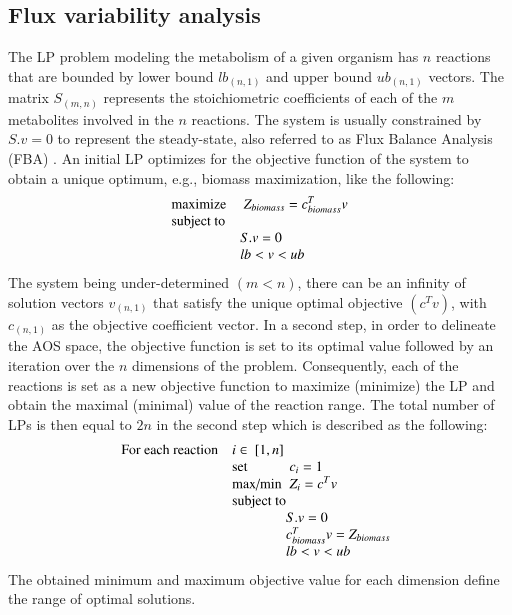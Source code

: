 \subsection*{Flux variability analysis}
The LP problem modeling the metabolism of a given organism has $n$ reactions that are bounded by lower bound $lb_{(n,1)}$ and upper bound $ub_{(n,1)}$ vectors.  The matrix $S_{(m,n)}$ represents the stoichiometric coefficients of each of the $m$ metabolites involved in the $n$ reactions. The system is usually constrained by $S.v=0$ to represent the steady-state, also referred to as Flux Balance Analysis (FBA) \cite{orth2010flux}. An initial LP optimizes for the objective function of the system to obtain a unique optimum, e.g., biomass maximization, like the following:
\begin{equation} \label{eq:one}
\begin{array}{ll@{}ll}
\text{maximize}  & \displaystyle\ Z_{biomass}=c^{T}_{biomass}v &\\
\text{subject to}\\
& S.v=0 \\
& lb<v<ub
\end{array}
\end{equation}
The system being under-determined $(m<n)$, there can be an infinity of solution vectors $v_{(n,1)}$ that satisfy the unique optimal objective $(c^{T}v)$, with $c_{(n,1)}$ as the objective coefficient vector. In a second step, in order to delineate the AOS space, the objective function is set to its optimal value followed by an iteration over the $n$ dimensions of the problem. Consequently, each of the reactions is set as a new objective function to maximize (minimize) the LP and obtain the maximal (minimal) value of the reaction range. The total number of LPs is then equal to $2n$ in the second step which is described as the following:
\begin{equation} \label{eq:two}
\begin{array}{ll@{}ll@{}ll}
\text{For each reaction} & i \in \displaystyle\ [1,n] &\\
& \text{set} & \displaystyle\ c_{i}=1 &\\
& \text{max/min}  & \displaystyle\ Z_{i}=c^{T}v &\\
& \text{subject to}\\
& & S.v=0 \\
& & c^{T}_{biomass}v=Z_{biomass} \\
& & lb<v<ub
\end{array}
\end{equation}
The obtained minimum and maximum objective value for each dimension define the range of optimal solutions.
